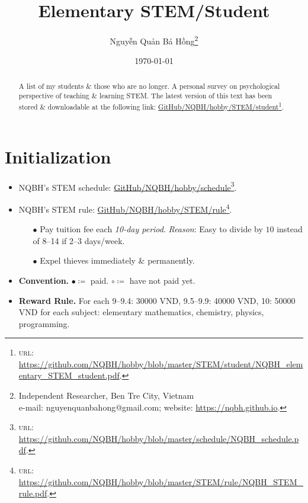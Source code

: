 \documentclass{article}
\title{Elementary STEM\textsf{/}Student}
\author{\selectlanguage{vietnamese} Nguyễn Quản Bá Hồng\footnote{Independent Researcher, Ben Tre City, Vietnam\\e-mail: \textsf{nguyenquanbahong@gmail.com}; website: \url{https://nqbh.github.io}.}}
\date{\today}
\numberwithin{equation}{section}
\begin{document}
\maketitle
\begin{abstract}
	A list of my students \& those who are no longer. A personal survey on psychological perspective of teaching \& learning STEM. The latest version of this text has been stored \& downloadable at the following link: \href{https://github.com/NQBH/hobby/blob/master/STEM/student/NQBH_elementary_STEM_student.pdf}{GitHub\textsf{/}NQBH\textsf{/}hobby\textsf{/}STEM\textsf{/}student}\footnote{\textsc{url}: \url{https://github.com/NQBH/hobby/blob/master/STEM/student/NQBH_elementary_STEM_student.pdf}.}.
\end{abstract}
\tableofcontents
\newpage


\section*{Initialization}

\begin{itemize}
	\item NQBH's STEM schedule: \href{https://github.com/NQBH/hobby/blob/master/schedule/NQBH_schedule.pdf}{GitHub\textsf{/}NQBH\textsf{/}hobby\textsf{/}schedule}\footnote{\textsc{url}: \url{https://github.com/NQBH/hobby/blob/master/schedule/NQBH_schedule.pdf}.}.
	\item NQBH's STEM rule: \href{https://github.com/NQBH/hobby/blob/master/STEM/rule/NQBH_STEM_rule.pdf}{GitHub\textsf{/}NQBH\textsf{/}hobby\textsf{/}STEM\textsf{/}rule}\footnote{\textsc{url}: \url{https://github.com/NQBH/hobby/blob/master/STEM/rule/NQBH_STEM_rule.pdf}.}.
	\begin{itemize}
		\item[$\bullet$] Pay tuition fee each \textit{10-day period}. \textit{Reason}: Easy to divide by $10$ instead of 8--14 if 2--3 days\textsf{/}week.
		\item[$\bullet$] Expel thieves immediately \& permanently.
	\end{itemize}
	\item \textbf{Convention.} $\bullet\coloneq$ paid. $\circ\coloneq$ have not paid yet.
	\item \textbf{Reward Rule.} For each 9--9.4: 30000 VND, 9.5--9.9: 40000 VND, 10: 50000 VND for each subject: elementary mathematics, chemistry, physics, programming.
\end{itemize}
\end{document}
